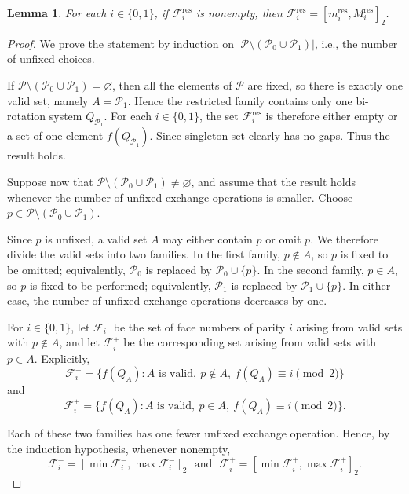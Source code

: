 \documentclass[10pt,a4paper]{amsart}
\newtheorem{lemma}[theorem]{Lemma}
\newcommand{\intervaltwo}[2]{[#1,#2]_2}
\begin{document}
\begin{lemma}
\label{lem4:2}
For each $i\in\{0,1\}$, if
$\mathcal F_i^{\mathrm{res}}$
is nonempty, then $\mathcal F_i^{\mathrm{res}}=\intervaltwo{m_i^{\mathrm{res}}}{M_i^{\mathrm{res}}}$.
\end{lemma}


\begin{proof}
We prove the statement by induction on
$\left|\mathcal P\setminus(\mathcal P_0\cup\mathcal P_1)\right|$,
i.e., the number of unfixed choices.

If $\mathcal P\setminus(\mathcal P_0\cup\mathcal P_1)=\varnothing$, then all the elements of $\mathcal P$ are fixed, so there is exactly one valid set, namely $A=\mathcal P_1$. Hence the restricted family contains only one bi-rotation system $Q_{\mathcal P_1}$. For each $i\in\{0,1\}$, the set $\mathcal F_i^{\mathrm{res}}$ is therefore either empty or  a set of one-element ${f(Q_{\mathcal P_1})}$. Since  singleton set clearly has no gaps. Thus the result holds.

Suppose now that $\mathcal P\setminus(\mathcal P_0\cup\mathcal P_1)\neq\varnothing$, and assume that the result holds whenever the number of unfixed exchange operations is smaller. Choose $p\in\mathcal P\setminus(\mathcal P_0\cup\mathcal P_1)$.

Since $p$ is unfixed, a valid set $A$ may either contain $p$ or omit $p$. We therefore divide the valid sets into two families. In the first family, $p\notin A$, so $p$ is fixed to be omitted; equivalently, $\mathcal P_0$ is replaced by $\mathcal P_0\cup\{p\}$. In the second family, $p\in A$, so $p$ is fixed to be performed; equivalently, $\mathcal P_1$ is replaced by $\mathcal P_1\cup\{p\}$. In either case, the number of unfixed exchange operations decreases by one.

For $i\in\{0,1\}$, let $\mathcal F_i^-$ be the set of face numbers of parity $i$ arising from valid sets with $p\notin A$, and let $\mathcal F_i^+$ be the corresponding set arising from valid sets with $p\in A$. Explicitly,
\[
\mathcal F_i^-= \bigl\{f(Q_A):A\text{ is valid},\ p\notin A,\ f(Q_A)\equiv i\pmod 2\bigr\}
\]
and
\[
\mathcal F_i^+= \bigl\{f(Q_A):A\text{ is valid},\ p\in A,\ f(Q_A)\equiv i\pmod 2\bigr\}.
\]

Each of these two families has one fewer unfixed exchange operation. Hence, by the induction hypothesis, whenever nonempty,  $$\mathcal F_i^-= \intervaltwo{\min\mathcal F_i^-}{\max\mathcal F_i^-}~~~ \mbox{and}~~~\mathcal F_i^+= \intervaltwo{\min\mathcal F_i^+}{\max\mathcal F_i^+}.$$


\end{proof}
\end{document}
